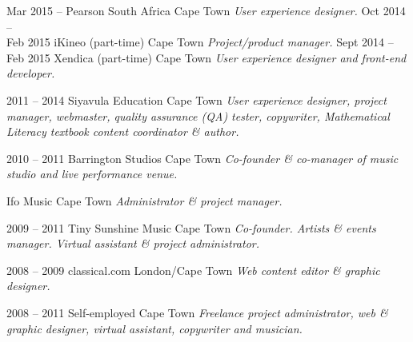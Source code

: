 \documentclass[]{friggeri-cv} %
\begin{document}
\begin{entrylist}
\entry
{Mar 2015 -- }
{Pearson South Africa}
{Cape Town}
{\emph{User experience designer.}}
\entry
{Oct 2014 -- \\ Feb 2015}
{iKineo (part-time)}
{Cape Town}
{\emph{Project/product manager.}}
\entry
{Sept 2014 -- \\Feb 2015}
{Xendica (part-time)}
{Cape Town}
{\emph{User experience designer and front-end developer.}}

\entry
{2011 -- 2014}
{Siyavula Education}
{Cape Town}
{\emph{User experience designer, project manager, webmaster, quality assurance (QA) tester, copywriter, Mathematical Literacy textbook content coordinator \& author.}}

\entry
{2010 -- 2011}
{Barrington Studios}
{Cape Town}
{\emph{Co-founder \& co-manager of music studio and live performance venue.}}



\entry
{}
{Ifo Music}
{Cape Town}
{\emph{Administrator \& project manager.}}

\entry
{2009 -- 2011}
{Tiny Sunshine Music}
{Cape Town}
{\emph{Co-founder. Artists \& events manager. Virtual assistant \& project administrator.}}


\entry
{2008 -- 2009}
{classical.com}
{London/Cape Town}
{\emph{Web content editor \& graphic designer.}}


\entry
{2008 -- 2011}
{Self-employed}
{Cape Town}
{\emph{Freelance project administrator, web \& graphic designer, virtual assistant, copywriter and musician.}}

\end{entrylist}

\renewcommand{\entry}[4]{%
  #1&\parbox[t]{13.5cm}{%
    \textbf{#2}%
    \hfill%
    {\footnotesize\addfontfeature{Color=lightgray} #3}\\%
    #4\vspace{3\parsep}%
  }\\}
\end{document}
